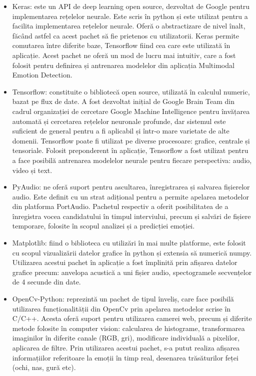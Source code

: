 \documentclass[a4paper, 12pt]{report}
\begin{document}
	\begin{itemize}
	 	\item Keras: este un API de deep learning open source, dezvoltat de Google pentru implementarea rețelelor neurale. Este scris în python și este utilizat pentru a facilita implementarea rețelelor neurale. Oferă o abstractizare de nivel înalt, făcând astfel ca acest pachet să fie prietenos cu utilizatorii. Keras permite comutarea între diferite baze, Tensorflow fiind cea care este utilizată în aplicație. Acest pachet ne oferă un mod de lucru mai intuitiv, care a fost folosit pentru definirea și antrenarea modelelor din aplicația Multimodal Emotion Detection.
	
		\item Tensorflow: constituite o bibliotecă open source, utilizată în calculul numeric, bazat pe flux de date. A fost dezvoltat inițial de Google Brain Team din cadrul organizației de cercetare Google Machine Intelligence pentru învățarea automată și cercetarea rețelelor neuronale profunde, dar sistemul este suficient de general pentru a fi aplicabil și într-o mare varietate de alte domenii. Tensorflow poate fi utilizat pe diverse procesoare: grafice, centrale și tensoriale. Folosit preponderent în aplicație, Tensorflow a fost utilizat pentru a face posibilă antrenarea modelelor neurale pentru fiecare perspectiva: audio, video și text.
	
		\item PyAudio: ne oferă suport pentru ascultarea, înregistrarea și salvarea fișierelor audio. Este definit cu un strat adițional pentru a permite apelarea metodelor din platforma PortAudio. Pachetul respectiv a oferit posibilitatea de a înregistra vocea candidatului în timpul interviului, precum și salvări de fișiere temporare, folosite în scopul analizei și a predicției emoției.
	
		\item Matplotlib: fiind o biblioteca cu utilizări în mai multe platforme, este folosit cu scopul vizualizării datelor grafice în python și extensia să numerică numpy. Utilizarea acestui pachet în aplicație a fost împlinită prin afișarea datelor grafice precum: anvelopa acustică a uni fișier audio, spectogramele secvențelor de 4 secunde din date.
	
		\item OpenCv-Python: reprezintă un pachet de tipul înveliș, care face posibilă utilizarea funcționalității din OpenCv prin apelarea metodelor scrise în C/C++. Acesta oferă suport pentru utilizarea camerei web, precum și diferite metode folosite în computer vision: calcularea de histograme, transformarea imaginilor în diferite canale (RGB, gri), modificare individuală a pixelilor, aplicarea de filtre. Prin utilizarea acestui pachet, s-a putut realiza afișarea informațiilor referitoare la emoții în timp real, desenarea trăsăturilor feței (ochi, nas, gură etc).
	

\end{itemize}
\end{document}
